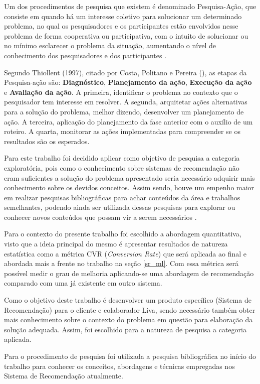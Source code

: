 Um dos procedimentos de pesquisa que existem é denominado Pesquisa-Ação, que consiste em quando há um interesse coletivo para solucionar um determinado problema, no qual os pesquisadores e os participantes estão envolvidos nesse problema de forma cooperativa ou participativa, com o intuito de solucionar ou no mínimo esclarecer o problema da situação, aumentando o nível de conhecimento dos pesquisadores e dos participantes \cite{de2013metodologia}.

Segundo Thiollent (1997), citado por Costa, Politano e Pereira (\citeyear{Costa}), as etapas da Pesquisa-ação são: \textbf{Diagnóstico}, \textbf{Planejamento da ação}, \textbf{Execução da ação} e \textbf{Avaliação da ação}. A primeira, identificar o problema no contexto que o pesquisador tem interesse em resolver. A segunda, arquitetar ações alternativas para a solução do problema, melhor dizendo, desenvolver um planejamento de ação. A terceira, aplicação do planejamento da fase anterior com o auxílio de um roteiro. A quarta, monitorar as ações implementadas para compreender se os resultados são os esperados.

Para este trabalho foi decidido aplicar como objetivo de pesquisa a categoria exploratória, pois como o conhecimento sobre sistemas de recomendação não eram suficientes a solução do problema apresentado seria necessário adquirir mais conhecimento sobre os devidos conceitos. Assim sendo, houve um empenho maior em realizar pesquisas bibliográficas para achar conteúdos da área e trabalhos semelhantes, podendo ainda ser utilizada dessas pesquisas para explorar ou conhecer novos conteúdos que possam vir a serem necessários \cite{Moretti:2018}.

Para o contexto do presente trabalho foi escolhido a abordagem quantitativa, visto que a ideia principal do mesmo é apresentar resultados de natureza estatística como a métrica CVR (\textit{Conversion Rate}) que será aplicada ao final e abordada mais a frente no trabalho na seção \ref{sr_ml}. Com essa métrica será possível medir o grau de melhoria aplicando-se uma abordagem de recomendação comparado com uma já existente em outro sistema.

Como o objetivo deste trabalho é desenvolver um produto específico (Sistema de Recomendação) para o cliente e colaborador Liva, sendo necessário também obter mais conhecimento sobre o contexto do problema em questão para elaboração da solução adequada. Assim, foi escolhido para a natureza de pesquisa a categoria aplicada.

Para o procedimento de pesquisa foi utilizada a pesquisa bibliográfica no início do trabalho para conhecer os conceitos, abordagens e técnicas empregadas nos Sistema de Recomendação atualmente.

